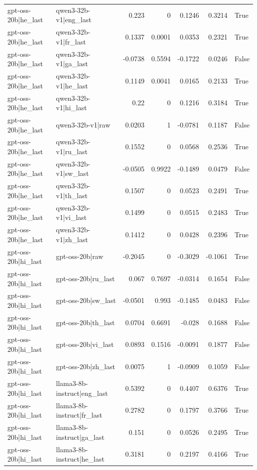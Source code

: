 \begin{table}
\begin{tabular}{l l r r r r l}
gpt-oss-20b|he_last & qwen3-32b-v1|eng_last & 0.223 & 0 & 0.1246 & 0.3214 & True \\
gpt-oss-20b|he_last & qwen3-32b-v1|fr_last & 0.1337 & 0.0001 & 0.0353 & 0.2321 & True \\
gpt-oss-20b|he_last & qwen3-32b-v1|ga_last & -0.0738 & 0.5594 & -0.1722 & 0.0246 & False \\
gpt-oss-20b|he_last & qwen3-32b-v1|he_last & 0.1149 & 0.0041 & 0.0165 & 0.2133 & True \\
gpt-oss-20b|he_last & qwen3-32b-v1|hi_last & 0.22 & 0 & 0.1216 & 0.3184 & True \\
gpt-oss-20b|he_last & qwen3-32b-v1|raw & 0.0203 & 1 & -0.0781 & 0.1187 & False \\
gpt-oss-20b|he_last & qwen3-32b-v1|ru_last & 0.1552 & 0 & 0.0568 & 0.2536 & True \\
gpt-oss-20b|he_last & qwen3-32b-v1|sw_last & -0.0505 & 0.9922 & -0.1489 & 0.0479 & False \\
gpt-oss-20b|he_last & qwen3-32b-v1|th_last & 0.1507 & 0 & 0.0523 & 0.2491 & True \\
gpt-oss-20b|he_last & qwen3-32b-v1|vi_last & 0.1499 & 0 & 0.0515 & 0.2483 & True \\
gpt-oss-20b|he_last & qwen3-32b-v1|zh_last & 0.1412 & 0 & 0.0428 & 0.2396 & True \\
gpt-oss-20b|hi_last & gpt-oss-20b|raw & -0.2045 & 0 & -0.3029 & -0.1061 & True \\
gpt-oss-20b|hi_last & gpt-oss-20b|ru_last & 0.067 & 0.7697 & -0.0314 & 0.1654 & False \\
gpt-oss-20b|hi_last & gpt-oss-20b|sw_last & -0.0501 & 0.993 & -0.1485 & 0.0483 & False \\
gpt-oss-20b|hi_last & gpt-oss-20b|th_last & 0.0704 & 0.6691 & -0.028 & 0.1688 & False \\
gpt-oss-20b|hi_last & gpt-oss-20b|vi_last & 0.0893 & 0.1516 & -0.0091 & 0.1877 & False \\
gpt-oss-20b|hi_last & gpt-oss-20b|zh_last & 0.0075 & 1 & -0.0909 & 0.1059 & False \\
gpt-oss-20b|hi_last & llama3-8b-instruct|eng_last & 0.5392 & 0 & 0.4407 & 0.6376 & True \\
gpt-oss-20b|hi_last & llama3-8b-instruct|fr_last & 0.2782 & 0 & 0.1797 & 0.3766 & True \\
gpt-oss-20b|hi_last & llama3-8b-instruct|ga_last & 0.151 & 0 & 0.0526 & 0.2495 & True \\
gpt-oss-20b|hi_last & llama3-8b-instruct|he_last & 0.3181 & 0 & 0.2197 & 0.4166 & True \\

\end{tabular}
\end{table}
